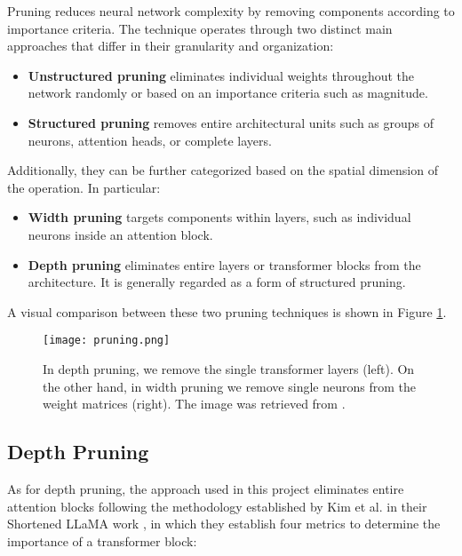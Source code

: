 Pruning reduces neural network complexity by removing components according to importance criteria. The technique operates through two distinct main approaches that differ in their granularity and organization:

\begin{itemize}
    \item \textbf{Unstructured pruning} eliminates individual weights throughout the network randomly or based on an importance criteria such as magnitude.
    \item \textbf{Structured pruning} removes entire architectural units such as groups of neurons, attention heads, or complete layers.
\end{itemize}

Additionally, they can be further categorized based on the spatial dimension of the operation. In particular:
\begin{itemize}
    \item \textbf{Width pruning} targets components within layers, such as individual neurons inside an attention block.
    \item \textbf{Depth pruning} eliminates entire layers or transformer blocks from the architecture. It is generally regarded as a form of structured pruning.
\end{itemize}

A visual comparison between these two pruning techniques is shown in Figure \ref{fig:pruning_comparison}.

\begin{figure}[htbp]
    \centering
    \texttt{[image: pruning.png]}
    \caption[Comparison of Depth and Width Pruning]{In depth pruning, we remove the single transformer layers (left). On the other hand, in width pruning we remove single neurons from the weight matrices (right). The image was retrieved from \cite{shortened_llama}.}
    \label{fig:pruning_comparison}
\end{figure}

\subsection{Depth Pruning} \label{depth_pruning}

As for depth pruning, the approach used in this project eliminates entire attention blocks following the methodology established by Kim et al. in their Shortened LLaMA work \cite{shortened_llama}, in which they establish four metrics to determine the importance of a transformer block:

